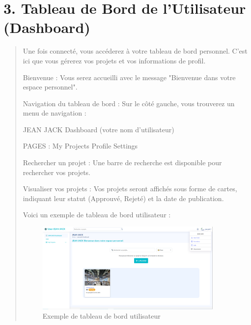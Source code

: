 \documentclass[a4paper,12pt]{article}
\begin{document}
\section*{3. Tableau de Bord de l'Utilisateur (Dashboard)}
\begin{quote}
Une fois connecté, vous accéderez à votre tableau de bord personnel. C'est ici que vous gérerez vos projets et vos informations de profil.

Bienvenue : Vous serez accueilli avec le message "Bienvenue dans votre espace personnel".

Navigation du tableau de bord : Sur le côté gauche, vous trouverez un menu de navigation :

JEAN JACK Dashboard (votre nom d'utilisateur)

PAGES :
My Projects
Profile
Settings

Rechercher un projet : Une barre de recherche est disponible pour rechercher vos projets.

Visualiser vos projets : Vos projets seront affichés sous forme de cartes, indiquant leur statut (Approuvé, Rejeté) et la date de publication.

Voici un exemple de tableau de bord utilisateur :

\begin{figure}[H]
\centering
\includegraphics[width=0.9\textwidth]{IMAGES/dashboard-utilisateur.png}
\caption{Exemple de tableau de bord utilisateur}
\label{fig:dashboard}
\end{figure}

\end{quote}
\end{document}
